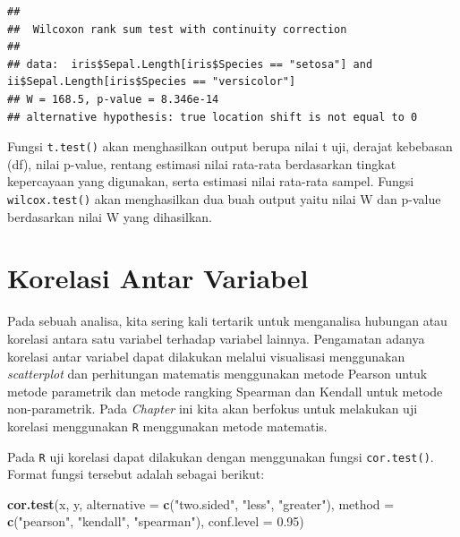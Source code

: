 \documentclass[]{book}
\newenvironment{Shaded}{\begin{snugshade}}{\end{snugshade}}
\newcommand{\DataTypeTok}[1]{\textcolor[rgb]{0.13,0.29,0.53}{#1}}
\newcommand{\FloatTok}[1]{\textcolor[rgb]{0.00,0.00,0.81}{#1}}
\newcommand{\KeywordTok}[1]{\textcolor[rgb]{0.13,0.29,0.53}{\textbf{#1}}}
\newcommand{\NormalTok}[1]{#1}
\newcommand{\StringTok}[1]{\textcolor[rgb]{0.31,0.60,0.02}{#1}}
\theoremstyle{definition}
\theoremstyle{definition}
\theoremstyle{definition}
\theoremstyle{remark}
\begin{document}
\begin{verbatim}
## 
##  Wilcoxon rank sum test with continuity correction
## 
## data:  iris$Sepal.Length[iris$Species == "setosa"] and ii$Sepal.Length[iris$Species == "versicolor"]
## W = 168.5, p-value = 8.346e-14
## alternative hypothesis: true location shift is not equal to 0
\end{verbatim}

Fungsi \texttt{t.test()} akan menghasilkan output berupa nilai t uji, derajat kebebasan (df), nilai p-value, rentang estimasi nilai rata-rata berdasarkan tingkat kepercayaan yang digunakan, serta estimasi nilai rata-rata sampel. Fungsi \texttt{wilcox.test()} akan menghasilkan dua buah output yaitu nilai W dan p-value berdasarkan nilai W yang dihasilkan.

\hypertarget{korelasi-antar-variabel}{%
\section{Korelasi Antar Variabel}\label{korelasi-antar-variabel}}

Pada sebuah analisa, kita sering kali tertarik untuk menganalisa hubungan atau korelasi antara satu variabel terhadap variabel lainnya. Pengamatan adanya korelasi antar variabel dapat dilakukan melalui visualisasi menggunakan \emph{scatterplot} dan perhitungan matematis menggunakan metode Pearson untuk metode parametrik dan metode rangking Spearman dan Kendall untuk metode non-parametrik. Pada \emph{Chapter} ini kita akan berfokus untuk melakukan uji korelasi menggunakan \texttt{R} menggunakan metode matematis.

Pada \texttt{R} uji korelasi dapat dilakukan dengan menggunakan fungsi \texttt{cor.test()}. Format fungsi tersebut adalah sebagai berikut:

\begin{Shaded}
\begin{Highlighting}[]
\KeywordTok{cor.test}\NormalTok{(x, y,}
         \DataTypeTok{alternative =} \KeywordTok{c}\NormalTok{(}\StringTok{"two.sided"}\NormalTok{, }\StringTok{"less"}\NormalTok{, }\StringTok{"greater"}\NormalTok{),}
         \DataTypeTok{method =} \KeywordTok{c}\NormalTok{(}\StringTok{"pearson"}\NormalTok{, }\StringTok{"kendall"}\NormalTok{, }\StringTok{"spearman"}\NormalTok{),}
         \DataTypeTok{conf.level =} \FloatTok{0.95}\NormalTok{)}
\end{Highlighting}
\end{Shaded}
\end{document}

